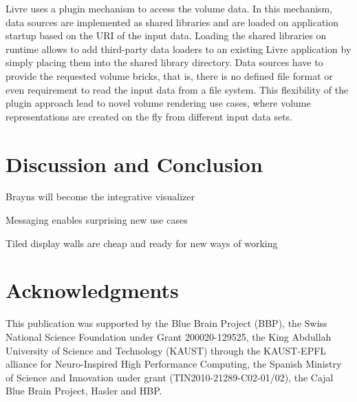 \documentclass[10pt]{llncs}
\newcommand{\FIXME}[1]{\textbf{\color{BLUE}{FIXME: #1}}}
\begin{document}
Livre uses a plugin mechanism to access the volume data. In this mechanism, data
sources are implemented as shared libraries and are loaded on application
startup based on the URI of the input data. Loading the shared libraries on
runtime allows to add third-party data loaders to an existing Livre application
by simply placing them into the shared library directory. Data sources have to
provide the requested volume bricks, that is, there is no defined file format or
even requirement to read the input data from a file system. This flexibility of
the plugin approach lead to novel volume rendering use cases, where volume
representations are created on the fly from different input data sets.

\FIXME{teaser gallery}

\section{Discussion and Conclusion}
\label{sec:conclusions}

Brayns will become the integrative visualizer

Messaging enables surprising new use cases

Tiled display walls are cheap and ready for new ways of working



\section*{Acknowledgments}
This publication was supported by the Blue Brain Project (BBP), the Swiss
National Science Foundation under Grant 200020-129525, the King Abdullah
University of Science and Technology (KAUST) through the KAUST-EPFL alliance for
Neuro-Inspired High Performance Computing, the Spanish Ministry of Science and
Innovation under grant (TIN2010-21289-C02-01/02), the Cajal Blue Brain Project,
Hasler and HBP.





\end{document}
